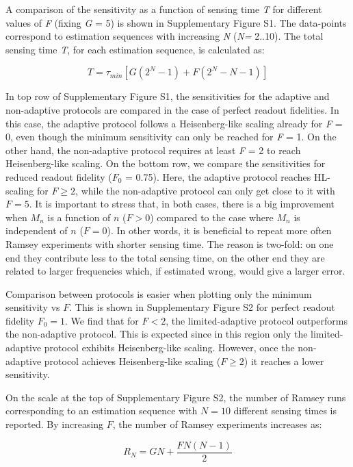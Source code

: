 \documentclass{report}
\begin{document}
A comparison of the sensitivity as a function of sensing time \textit{T} for different values of \textit{F} (fixing \textit{G} = 5) is shown in Supplementary Figure S1. The data-points correspond to estimation sequences with increasing \textit{N} (\textit{N=} 2..10). The total sensing time \textit{T}, for each estimation sequence, is calculated as:

\begin{equation}
T=\tau_{min}[G(2^N -1)+ F(2^N - N - 1)]
\end{equation}

In top row of Supplementary Figure S1, the sensitivities for the adaptive and non-adaptive protocols are compared in the case of perfect readout fidelities. In this case, the adaptive protocol follows a Heisenberg-like scaling already for \textit{F} = 0, even though the minimum sensitivity can only be reached for \textit{F} = 1. On the other hand, the non-adaptive protocol requires at least \textit{F} = 2 to reach Heisenberg-like scaling. On the bottom row, we compare the sensitivities for reduced readout fidelity ($F_0$ = 0.75). Here, the adaptive protocol reaches HL-scaling for $F\geq2$, while the non-adaptive protocol can only get close to it with $F=5$. 
It is important to stress that, in both cases, there is a big improvement when $M_n$ is a function of $n$ ($F>0$) compared to the case where $M_n$ is independent of $n$ ($F=0$). In other words, it is beneficial to repeat more often Ramsey experiments with shorter sensing time. The reason is two-fold: on one end they contribute less to the total sensing time, on the other end they are related to larger frequencies which, if estimated wrong, would give a larger error.

Comparison between protocols is easier when plotting only the minimum sensitivity vs $F$. This is shown in Supplementary Figure S2 for perfect readout fidelity $F_0=1$. We find that for $F<2$, the limited-adaptive protocol outperforms the non-adaptive protocol. This is expected since in this region only the limited-adaptive protocol exhibits Heisenberg-like scaling. However, once the non-adaptive protocol achieves Heisenberg-like scaling ($F\geq2$) it reaches a lower sensitivity.

On the scale at the top of Supplementary Figure S2, the number of Ramsey runs corresponding to an estimation sequence with $N = 10$ different sensing times is reported. By increasing $F$, the number of Ramsey experiments increases as:

\begin{equation}
R_N = GN + \frac{FN(N-1)}{2}
\end{equation}
\end{document}
